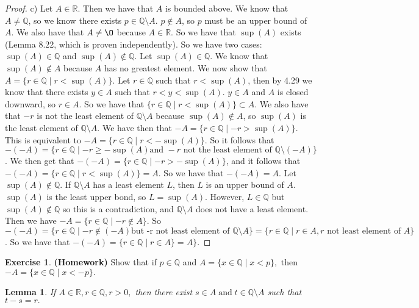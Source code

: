\documentclass[12pt]{article}
\newcommand{\bbQ}{\mathbb{Q}}
\newcommand{\bbR}{\mathbb{R}}
\renewcommand{\emptyset}{\O}
\renewcommand{\_}[1]{\underline{ #1 }}
\newtheorem{lemma}[theorem]{Lemma}
\theoremstyle{definition}
\newtheorem{exercise}[theorem]{Exercise}
\numberwithin{equation}{subsection}
\begin{document}
\begin{proof}
c) Let $A \in \bbR$. Then we have that $A$ is bounded above. We know that $A \not = \bbQ$, so we know there exists $p \in \bbQ \setminus A$. $p \not \in A$, so $p$ must be an upper bound of $A$. We also have that $A \not = \emptyset$ because $A \in \bbR$. So we have that $\sup(A)$ exists (Lemma 8.22, which is proven independently). So we have two cases: $\sup(A) \in \bbQ$ and $\sup(A) \not \in \bbQ$. \newline
Let $\sup(A) \in \bbQ$. We know that $\sup(A) \not \in A$ because $A$ has no greatest element. We now show that $A = \{r \in \bbQ \mid r < \sup(A)\}$. Let $r \in \bbQ$ such that $r < \sup(A)$, then by 4.29 we know that there exists $y \in A$ such that $r < y < \sup(A)$. $y \in A$ and $A$ is closed downward, so $r \in A$. So we have that $\{r \in \bbQ \mid r < \sup(A)\} \subset A$. We also have that $-r$ is not the least element of $\bbQ \setminus A$ because $\sup(A) \not \in A$, so $\sup(A)$ is the least element of $\bbQ \setminus A$. We have then that $-A = \{r \in \bbQ \mid -r > \sup(A)\}$. This is equivalent to $-A = \{r \in \bbQ \mid r < -\sup(A)\}$. So it follows that $-(-A) = \{r \in \bbQ \mid -r \geq -\sup(A) \text{and } -r \text{ not the least element of } \bbQ \setminus (-A)\}$. We then get that $-(-A) = \{r \in \bbQ \mid -r > -\sup(A)\}$, and it follows that $-(-A) = \{r \in \bbQ \mid r < \sup(A)\} = A$. So we have that $-(-A) = A$. \newline
Let $\sup(A) \not \in \bbQ$. If $\bbQ \setminus A$ has a least element $L$, then $L$ is an upper bound of $A$. $\sup(A)$ is the least upper bond, so $L = \sup(A)$. However, $L \in \bbQ$ but $\sup(A) \not \in \bbQ$ so this is a contradiction, and $\bbQ \setminus A$ does not have a least element. \newline
Then we have $-A = \{r \in \bbQ \mid -r \not \in A\}$. So $-(-A) = \{r \in \bbQ \mid -r \not \in (-A) \text{but -r not least element of } \bbQ \setminus A\} = \{r \in \bbQ \mid r \in A, r\text{ not least element of } A\}$. So we have that $-(-A) = \{r \in \bbQ \mid r \in A\} = A\}$.
\end{proof}

\begin{exercise}{\bf (Homework)}
Show that if $p\in\bbQ$ and $A=\{x\in\bbQ\mid x<p\},$ then $-A=\{x\in\bbQ\mid x<-p\}.$
\end{exercise}

\begin{lemma}
If $A\in\bbR, r\in\bbQ, r>0,$ then there exist $s\in A\;\mbox{and}\;t\in\bbQ\setminus A$ such that 
$t-s=r.$
\end{lemma}
\end{document}
